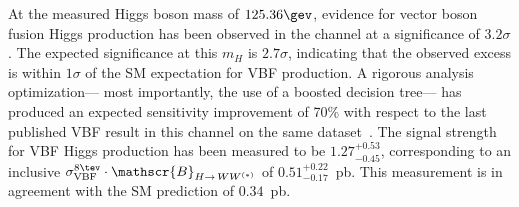 At the measured Higgs boson mass of $125.36 \gev$, evidence
for vector boson fusion Higgs production has been observed in the
\hwwlnln channel at a significance of $3.2\sigma$. The expected
significance at this $m_H$ is $2.7\sigma$, indicating that the observed
excess is within $1\sigma$ of the SM expectation for VBF production. A rigorous analysis
optimization--- most importantly, the use of a boosted decision
tree--- has produced an expected sensitivity improvement of 70\% with
respect to the last published VBF result in this channel on the same
dataset~\cite{bib:hww_moriond_2013}. The signal strength for VBF Higgs
production has been measured to be $1.27^{+0.53}_{-0.45}$,
corresponding to an inclusive
$\sigma_{\textrm{VBF}}^{8 \tev}\cdot\mathscr{B}_{\hww}$ of
$0.51^{+0.22}_{-0.17}$~pb. This measurement is in agreement with the
SM prediction of $0.34$~pb. 
